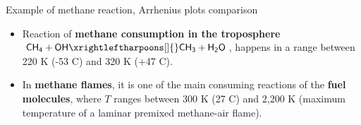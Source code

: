 \begin{frame}{Example of methane reaction, Arrhenius plots comparison}
	\lcol
	\begin{itemize}
			\item Reaction of {\bf methane consumption in the troposphere} $\mathsf{CH_4+OH  \xrightleftharpoons[]{} CH_3+H_2O}$, 
			happens in a range between 220 K (-53 \textdegree C) and 320 K (+47 \textdegree C). 
	\end{itemize}
	\rcol
	\begin{itemize}
		\item In {\bf methane flames}, it is one of the main consuming reactions of the {\bf fuel molecules}, where 
		$T$ ranges between 300 K (27 \textdegree C) and 2,200 K (maximum temperature of a laminar
		premixed methane-air flame). %
	\end{itemize}
	\ecol
	\begin{figure}[!t]
		\centering
		 \qquad \qquad
	\end{figure}
\end{frame}
%
